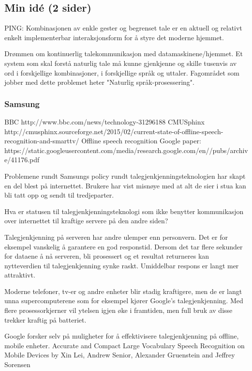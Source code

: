 \subsection{Min idé (2 sider)}
{\color{red}PING: Kombinasjonen av enkle gester og begrenset tale er en aktuell og relativt enkelt implementerbar interaksjonsform for å styre det moderne hjemmet.}

Drømmen om kontinuerlig talekommunikasjon med datamaskinene/hjemmet. Et system som skal forstå naturlig tale må kunne gjenkjenne og skille tusenvis av ord i forskjellige kombinasjoner, i forskjellige språk og uttaler. Fagområdet som jobber med dette problemet heter "Naturlig språk-prosessering". 

\subsubsection*{Samsung}
BBC http://www.bbc.com/news/technology-31296188
CMUSphinx http://cmusphinx.sourceforge.net/2015/02/current-state-of-offline-speech-recognition-and-smarttv/
Offline speech recognition Google paper: https://static.googleusercontent.com/media/research.google.com/en//pubs/archive/41176.pdf

Problemene rundt Samsungs policy rundt talegjenkjenningsteknologien har skapt en del blest på internettet. Brukere har vist misnøye med at alt de sier i stua kan bli tatt opp og sendt til tredjeparter. 

Hva er statusen til talegjenkjenningsteknologi som ikke benytter kommunikasjon over internettet til kraftige servere på den andre siden?  

Talegjenkjenning på serveren har andre ulemper enn personvern. Det er for eksempel vanskelig å garantere en god responstid. Dersom det tar flere sekunder for dataene å nå serveren, bli prosessert og et resultat returneres kan nytteverdien til talegjenkjenning synke raskt. Umiddelbar respons er langt mer attraktivt.

Moderne telefoner, tv-er og andre enheter blir stadig kraftigere, men de er langt unna supercomputerene som for eksempel kjører Google's talegjenkjenning. Med flere prosessorkjerner vil ytelsen igjen øke i framtiden, men full bruk av disse trekker kraftig på batteriet. 

Google forsker selv på muligheter for å effektivisere talegjenkjenning på offline, mobile enheter. {\color{red}Accurate and Compact Large Vocabulary Speech Recognition on Mobile Devices by Xin Lei, Andrew Senior, Alexander Gruenstein and Jeffrey Sorensen} 

